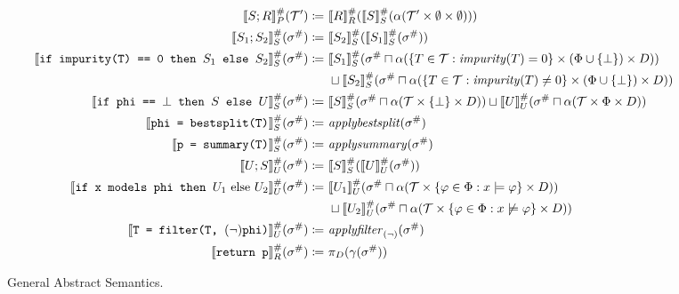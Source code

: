 \begin{figure}
\centering
\begin{align*}
\den[P]{S ; R}^\#(\mathcal{T}') \coloneqq&~
\den[R]{R}^\#(\den[S]{S}^\#(\alpha(\mathcal{T}' \times \emptyset \times \emptyset))) \\
%
\den[S]{S_1 ; S_2}^\#(\sigma^\#) \coloneqq&~
\den[S]{S_2}^\#(\den[S]{S_1}^\#(\sigma^\#)) \\
%
\den[S]{\iteimpuritynode{S_1}{S_2}}^\#(\sigma^\#) \coloneqq&~
\den[S]{S_1}^\#(\sigma^\# \sqcap \alpha(\{T \in \mathcal{T} : \mathit{impurity}(T) = 0\} \times (\Phi \cup \{\bot\}) \times D)) \\
&~\sqcup
\den[S]{S_2}^\#(\sigma^\# \sqcap \alpha(\{T \in \mathcal{T} : \mathit{impurity}(T) \neq 0\} \times (\Phi \cup \{\bot\}) \times D)) \\
%
\den[S]{\itetrivialnode{S}{U}}^\#(\sigma^\#) \coloneqq&~
\den[S]{S}^\#(\sigma^\# \sqcap \alpha(\mathcal{T} \times \{\bot\} \times D))
\sqcup
\den[U]{U}^\#(\sigma^\# \sqcap \alpha(\mathcal{T} \times \Phi \times D)) \\
%
\den[S]{\bestsplitnode}^\#(\sigma^\#) \coloneqq&~
\mathit{applybestsplit}(\sigma^\#) \\
%
\den[S]{\summarynode}^\#(\sigma^\#) \coloneqq&~
\mathit{applysummary}(\sigma^\#) \\
%
\den[U]{U ; S}^\#(\sigma^\#) \coloneqq&~
\den[S]{S}^\#(\den[U]{U}^\#(\sigma^\#)) \\
%
\den[U]{\itemodelsnode{U_1}{U_2}}^\#(\sigma^\#) \coloneqq&~
\den[U]{U_1}^\#(\sigma^\# \sqcap \alpha(\mathcal{T} \times \{\varphi \in \Phi : x \models \varphi\} \times D)) \\
&~\sqcup
\den[U]{U_2}^\#(\sigma^\# \sqcap \alpha(\mathcal{T} \times \{\varphi \in \Phi : x \not\models \varphi\} \times D)) \\
%
\den[U]{\filternode[(\lnot)]}^\#(\sigma^\#) \coloneqq&~
\mathit{applyfilter}_{(\lnot)}(\sigma^\#) \\
%
\den[R]{\returnnode}^\#(\sigma^\#) \coloneqq&~
\pi_D(\gamma(\sigma^\#))
\end{align*}
\caption{General Abstract Semantics.}
\label{fig:abstractgeneral}
\end{figure}

